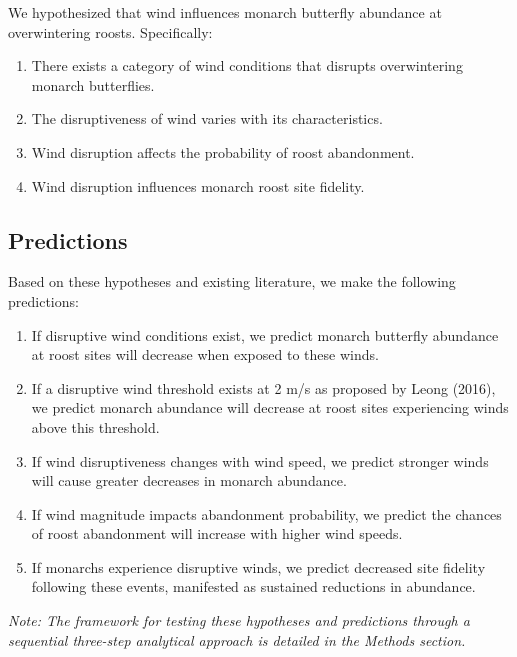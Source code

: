 We hypothesized that wind influences monarch butterfly abundance at overwintering roosts. Specifically:

\begin{enumerate}
\item There exists a category of wind conditions that disrupts overwintering monarch butterflies.
\item The disruptiveness of wind varies with its characteristics.
\item Wind disruption affects the probability of roost abandonment.
\item Wind disruption influences monarch roost site fidelity.
\end{enumerate}

\subsection{Predictions}

Based on these hypotheses and existing literature, we make the following predictions:

\begin{enumerate}
\item If disruptive wind conditions exist, we predict monarch butterfly abundance at roost sites will decrease when exposed to these winds.
\item If a disruptive wind threshold exists at 2 m/s as proposed by Leong (2016), we predict monarch abundance will decrease at roost sites experiencing winds above this threshold.
\item If wind disruptiveness changes with wind speed, we predict stronger winds will cause greater decreases in monarch abundance.
\item If wind magnitude impacts abandonment probability, we predict the chances of roost abandonment will increase with higher wind speeds.
\item If monarchs experience disruptive winds, we predict decreased site fidelity following these events, manifested as sustained reductions in abundance.
\end{enumerate}

\textit{Note: The framework for testing these hypotheses and predictions through a sequential three-step analytical approach is detailed in the Methods section.}